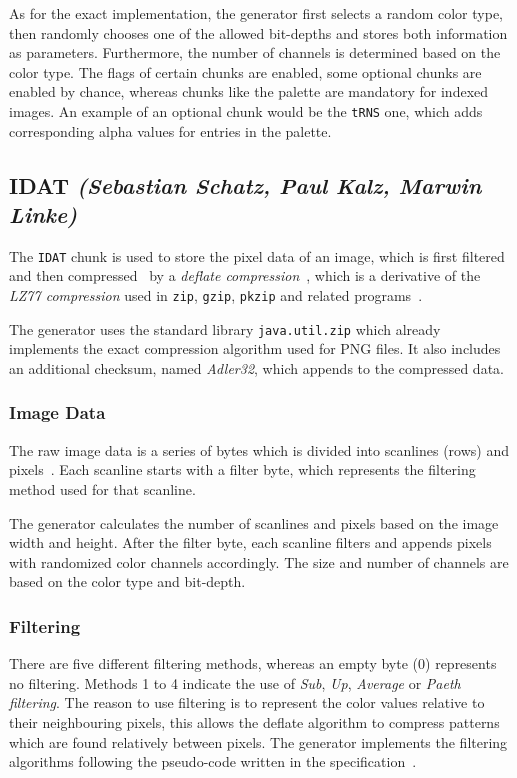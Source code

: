 \documentclass[runningheads]{llncs}
\begin{document}
As for the exact implementation, the generator first selects a random color type, then randomly chooses one of the allowed bit-depths and stores both information as parameters.
Furthermore, the number of channels is determined based on the color type. The flags of certain chunks are enabled, some optional chunks are enabled by chance, whereas chunks like the palette are mandatory for indexed images.
An example of an optional chunk would be the \texttt{tRNS} one, which adds corresponding alpha values for entries in the palette.

\subsection{IDAT \normalfont\textit{(Sebastian Schatz, Paul Kalz, Marwin Linke)}}
The \texttt{IDAT} chunk is used to store the pixel data of an image, which is first filtered and then compressed~\cite{libpng_chunks} by a \textit{deflate compression}~\cite{rfc_deflate_compression}, which is a derivative of the \textit{LZ77 compression} used in \texttt{zip}, \texttt{gzip}, \texttt{pkzip} and related programs~\cite{libpng_deflate}.

The generator uses the standard library \texttt{java.util.zip} which already implements the exact compression algorithm used for PNG files. It also includes an additional checksum, named \textit{Adler32}, which appends to the compressed data.
\subsubsection{Image Data}
The raw image data is a series of bytes which is divided into scanlines (rows) and pixels~\cite{libpng_data_representation}. 
Each scanline starts with a filter byte, which represents the filtering method used for that scanline.

The generator calculates the number of scanlines and pixels based on the image width and height.
After the filter byte, each scanline filters and appends pixels with randomized color channels accordingly.
The size and number of channels are based on the color type and bit-depth.
\subsubsection{Filtering}
There are five different filtering methods, whereas an empty byte (0) represents no filtering. 
Methods 1 to 4 indicate the use of \textit{Sub}, \textit{Up}, \textit{Average} or \textit{Paeth filtering}.
The reason to use filtering is to represent the color values relative to their neighbouring pixels, this allows the deflate algorithm to compress patterns which are found relatively between pixels.
The generator implements the filtering algorithms following the pseudo-code written in the specification~\cite{libpng_filtering}.
\end{document}
